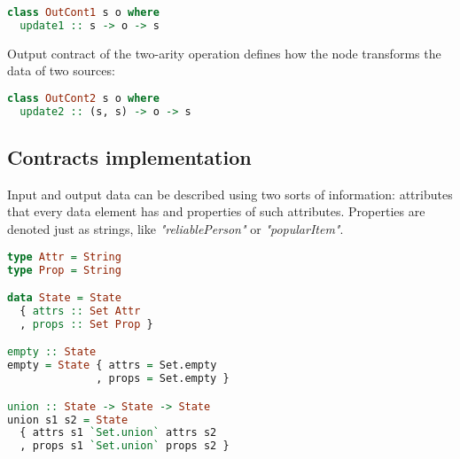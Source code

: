 \begin{lstlisting}[language=Haskell]
class OutCont1 s o where
  update1 :: s -> o -> s
\end{lstlisting}

Output contract of the two-arity operation defines how the node transforms the data of two sources:

\begin{lstlisting}[language=Haskell]
class OutCont2 s o where
  update2 :: (s, s) -> o -> s
\end{lstlisting}

\subsection{Contracts implementation}


Input and output data can be described using two sorts of information: attributes that every data element has and properties of such attributes.
Properties are denoted just as strings, like {\em "reliablePerson"} or {\em "popularItem"}.

\begin{lstlisting}[language=Haskell]
type Attr = String
type Prop = String

data State = State
  { attrs :: Set Attr
  , props :: Set Prop }

empty :: State
empty = State { attrs = Set.empty
              , props = Set.empty }

union :: State -> State -> State
union s1 s2 = State
  { attrs s1 `Set.union` attrs s2
  , props s1 `Set.union` props s2 }
\end{lstlisting}


